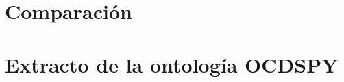 \begin{appendices}
\chapter{Comparación}
\label{chap:comparaciondeOntologias}


\chapter{Extracto de la ontología OCDSPY}

\end{appendices}